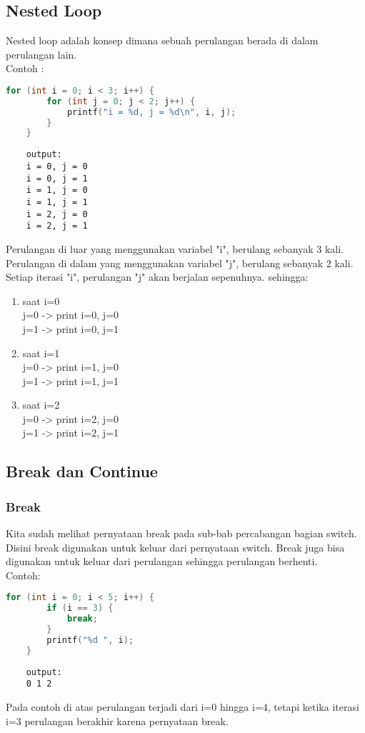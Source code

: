 \subsection{Nested Loop}

Nested loop adalah konsep dimana sebuah perulangan berada di dalam perulangan lain.
\\ Contoh :
\begin{lstlisting}[language=c]
	for (int i = 0; i < 3; i++) {
		for (int j = 0; j < 2; j++) {
			printf("i = %d, j = %d\n", i, j);
		}
	}
\end{lstlisting}
\begin{verbatim}
	output:
	i = 0, j = 0
	i = 0, j = 1
	i = 1, j = 0
	i = 1, j = 1
	i = 2, j = 0
	i = 2, j = 1
\end{verbatim}
Perulangan di luar yang menggunakan variabel "i", berulang sebanyak 3 kali.
Perulangan di dalam yang menggunakan variabel "j", berulang sebanyak 2 kali.
Setiap iterasi "i", perulangan "j" akan berjalan sepenuhnya. sehingga:
\begin{enumerate}[label={}, leftmargin=*]
	\item saat i=0 \\
	j=0 -> print i=0, j=0 \\
	j=1 -> print i=0, j=1
	\item saat i=1 \\
	j=0 -> print i=1, j=0 \\
	j=1 -> print i=1, j=1
	\item saat i=2 \\
	j=0 -> print i=2, j=0 \\
	j=1 -> print i=2, j=1
\end{enumerate}

\subsection{Break dan Continue}

\subsubsection{Break}

Kita sudah melihat pernyataan break pada sub-bab percabangan bagian switch.
Disini break digunakan untuk keluar dari pernyataan switch.
Break juga bisa digunakan untuk keluar dari perulangan sehingga perulangan berhenti.
\\ Contoh:
\begin{lstlisting}[language=c]
	for (int i = 0; i < 5; i++) {
		if (i == 3) {
			break;  
		}
		printf("%d ", i);
	}
\end{lstlisting}
\begin{verbatim}
	output:
	0 1 2
\end{verbatim}
Pada contoh di atas perulangan terjadi dari i=0 hingga i=4, tetapi ketika iterasi i=3 perulangan berakhir karena pernyataan break.

